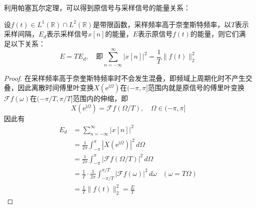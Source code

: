 利用帕塞瓦尔定理，可以得到原信号与采样信号的能量关系：

\begin{theorem}
    设$f(t)\in L^1(\mathbb{R})\cap L^2(\mathbb{R})$是带限函数，采样频率高于奈奎斯特频率，以$T$表示采样间隔，$E_d$表示采样信号$x[n]$的能量，$E$表示原信号$f(t)$的能量，则它们满足以下关系：
    \[E=TE_d,\quad \text{即}\sum_{n=-\infty}^{\infty}|x[n]|^2=\frac{1}{T}\|f(t)\|_2^2\]
\end{theorem}
\begin{proof}
    在采样频率高于奈奎斯特频率时不会发生混叠，即频域上周期化时不产生交叠，因此离散时间傅里叶变换$X(\mathrm{e}^{\mathrm{i}\Omega})$在$(-\pi,\pi]$范围内就是原信号的傅里叶变换$\mathcal{F} f(\omega)$在$(-\pi/T,\pi/T]$范围内的伸缩，即
    \[X(\mathrm{e}^{\mathrm{i}\Omega})=\mathcal{F} f(\Omega/T),\quad\Omega\in(-\pi,\pi]\]
    因此有
    \begin{align*}
        E_d&=\sum_{n=-\infty}^{\infty}|x[n]|^2\\
        &=\frac{1}{2\pi}\int_{-\pi}^{\pi}|X(\mathrm{e}^{\mathrm{i}\Omega})|^2\,d\Omega\\
        &=\frac{1}{2\pi}\int_{-\pi}^{\pi}|\mathcal{F} f(\Omega/T)|^2\,d\Omega\\
        &=\frac{1}{T}\cdot\frac{1}{2\pi}\int_{-\pi/T}^{\pi/T}|\mathcal{F} f(\omega)|^2\,d\omega&(\omega=T\Omega)\\
        &=\frac{1}{T}\|f(t)\|_2^2=\frac{E}{T}
    \end{align*}
\end{proof}